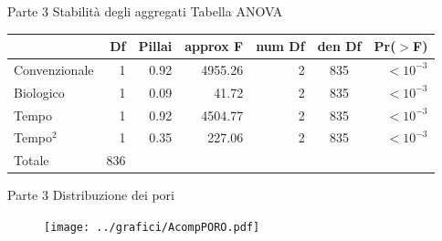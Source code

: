 \documentclass[xcolor={usenames, table, x11names}, final, 10pt]{beamer}
\begin{document}
\begin{frame}[label=Anova]{Parte 3 \small{Stabilità degli aggregati}}
  \hyperlink{Composizionale}{}
  \footnotesize
  Tabella ANOVA 
  \begin{table}
    \centering
    \begin{tabular}{lrrrrcr}
      \toprule
      & Df&Pillai& approx F & num Df & den Df & Pr($>$F) \\ 
      \midrule
      Convenzionale & 1 & 0.92 & 4955.26  &      2 &    835 & $<10^{-3}$\\ 
      Biologico     & 1 & 0.09 & 41.72    &      2 &    835 & $<10^{-3}$\\ 
      Tempo         & 1 & 0.92 & 4504.77  &      2 &    835 & $<10^{-3}$\\ 
      Tempo$^2$     & 1 & 0.35 & 227.06   &      2 &    835 & $<10^{-3}$\\ 
      Totale        & 836 &    &          &        &        &          \\ 
      \bottomrule
    \end{tabular}
  \end{table}
\end{frame}

\begin{frame}[label=Porosimetria]{Parte 3 \small{Distribuzione dei pori}}

  \hyperlink{finale}{}
  
  \begin{figure}
    \texttt{[image: ../grafici/AcompPORO.pdf]}
  \end{figure}

\end{frame}
\end{document}
